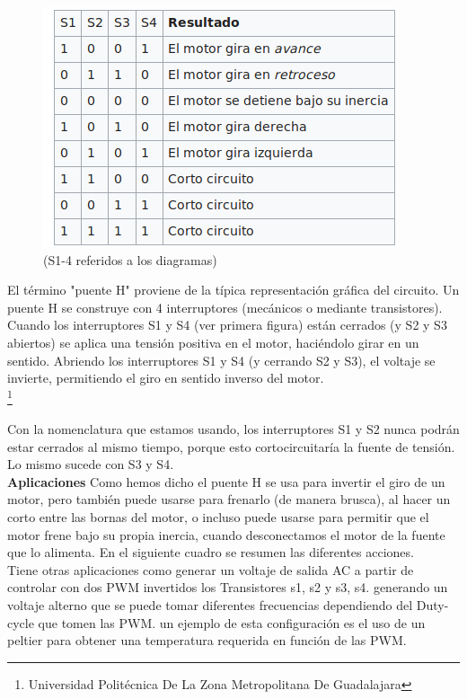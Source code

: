 \documentclass[10pt,a4paper]{article}
\begin{document}
\begin{figure}[hbtp]
\centering
\includegraphics[scale=0.5]{1.png}
\caption{(S1-4 referidos a los diagramas) }
\end{figure}

El término "puente H" proviene de la típica representación gráfica del circuito. Un puente H se construye con 4 interruptores (mecánicos o mediante transistores). Cuando los interruptores S1 y S4 (ver primera figura) están cerrados (y S2 y S3 abiertos) se aplica una tensión positiva en el motor, haciéndolo girar en un sentido. Abriendo los interruptores S1 y S4 (y cerrando S2 y S3), el voltaje se invierte, permitiendo el giro en sentido inverso del motor.\\

\footnote{Universidad Politécnica De La Zona Metropolitana De Guadalajara} 

\newpage

Con la nomenclatura que estamos usando, los interruptores S1 y S2 nunca podrán estar cerrados al mismo tiempo, porque esto cortocircuitaría la fuente de tensión. Lo mismo sucede con S3 y S4. \\
\textbf{Aplicaciones}
Como hemos dicho el puente H se usa para invertir el giro de un motor, pero también puede usarse para frenarlo (de manera brusca), al hacer un corto entre las bornas del motor, o incluso puede usarse para permitir que el motor frene bajo su propia inercia, cuando desconectamos el motor de la fuente que lo alimenta. En el siguiente cuadro se resumen las diferentes acciones.\\



Tiene otras aplicaciones como generar un voltaje de salida AC a partir de controlar con dos PWM invertidos los Transistores s1, s2 y s3, s4. generando un voltaje alterno que se puede tomar diferentes frecuencias dependiendo del Duty-cycle que tomen las PWM. un ejemplo de esta configuración es el uso de un peltier para obtener una temperatura requerida en función de las PWM. \\
\end{document}
